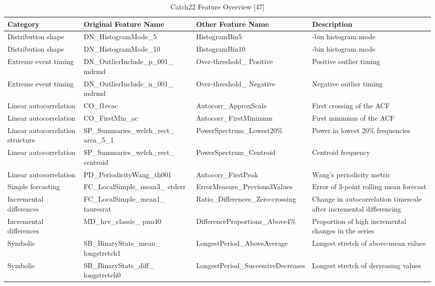 \documentclass{article}
\begin{document}
\renewcommand{\arraystretch}{1.5}
\begin{table}[H]

\caption{\label{tab:unnamed-chunk-22}Catch22 Feature Overview [47]}
\centering
\begin{tabular}[t]{>{\raggedright\arraybackslash}p{0.7in}|>{\raggedright\arraybackslash}p{2.1in}|>{\raggedright\arraybackslash}p{2.1in}|>{\raggedright\arraybackslash}p{1in}}
\hline
Category & Original Feature Name & Other Feature Name & Description\\
\hline
Distribution shape & DN\_HistogramMode\_5 & HistogramBin5 & 5-bin histogram mode\\
\hline
Distribution shape & DN\_HistogramMode\_10 & HistogramBin10 & 10-bin histogram mode\\
\hline
Extreme event timing & DN\_OutlierInclude\_p\_001\_ mdrmd & Over-threshold\_ Positive & Positive outlier timing\\
\hline
Extreme event timing & DN\_OutlierInclude\_n\_001\_ mdrmd & Over-threshold\_ Negative & Negative outlier timing\\
\hline
Linear autocorrelation & CO\_f1ecac & Autocorr\_ApproxScale & First  crossing of the ACF\\
\hline
Linear autocorrelation & CO\_FirstMin\_ac & Autocorr\_FirstMinimum & First minimum of the ACF\\
\hline
Linear autocorrelation structure & SP\_Summaries\_welch\_rect\_ area\_5\_1 & PowerSpectrum\_Lowest20\% & Power in lowest 20\% frequencies\\
\hline
Linear autocorrelation & SP\_Summaries\_welch\_rect\_ centroid & PowerSpectrum\_Centroid & Centroid frequency\\
\hline
Linear autocorrelation & PD\_PeriodicityWang\_th001 & Autocorr\_FirstPeak & Wang's periodicity metric\\
\hline
Simple forcasting & FC\_LocalSimple\_mean3\_ stderr & ErrorMeasure\_Previous3Values & Error of 3-point rolling mean forecast\\
\hline
Incremental differences & FC\_LocalSimple\_mean1\_ tauresrat & Ratio\_Differences\_Zero-crossing & Change in autocorrelation timescale after incremental differencing\\
\hline
Incremental differences & MD\_hrv\_classic\_ pnn40 & DifferenceProportions\_Above4\% & Proportion of high incremental changes in the series\\
\hline
Symbolic & SB\_BinaryStats\_mean\_ longstretch1 & LongestPeriod\_AboveAverage & Longest stretch of above-mean values\\
\hline
Symbolic & SB\_BinaryStats\_diff\_ longstretch0 & LongestPeriod\_SuccessiveDecreases & Longest stretch of decreasing values\\
\hline
\end{tabular}
\end{table}
\end{document}

